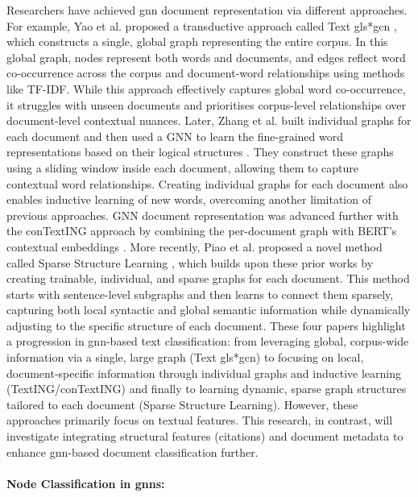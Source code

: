 \documentclass[10pt,oneside]{book}
\begin{document}
Researchers have achieved \gls*{gnn} document representation via different approaches. For example, Yao et al. proposed a transductive approach called Text gls*{gcn} \cite{yao_graph_2018}, which constructs a single, global graph representing the entire corpus. In this global graph, nodes represent both words and documents, and edges reflect word co-occurrence across the corpus and document-word relationships using methods like TF-IDF. While this approach effectively captures global word co-occurrence, it struggles with unseen documents and prioritises corpus-level relationships over document-level contextual nuances. Later, Zhang et al. built individual graphs for each document and then used a GNN to learn the fine-grained word representations based on their logical structures \cite{zhang_evaluating_2020}. They construct these graphs using a sliding window inside each document, allowing them to capture contextual word relationships. Creating individual graphs for each document also enables inductive learning of new words, overcoming another limitation of previous approaches. GNN document representation was advanced further with the conTextING approach by combining the per-document graph with BERT's contextual embeddings \cite{huang_contexting_2022}. More recently, Piao et al. proposed a novel method called Sparse Structure Learning \cite{piao_sparse_2022}, which builds upon these prior works by creating trainable, individual, and sparse graphs for each document. This method starts with sentence-level subgraphs and then learns to connect them sparsely, capturing both local syntactic and global semantic information while dynamically adjusting to the specific structure of each document. These four papers highlight a progression in \gls*{gnn}-based text classification: from leveraging global, corpus-wide information via a single, large graph (Text gls*{gcn}) to focusing on local, document-specific information through individual graphs and inductive learning (TextING/conTextING) and finally to learning dynamic, sparse graph structures tailored to each document (Sparse Structure Learning). However, these approaches primarily focus on textual features. This research, in contrast, will investigate integrating structural features (citations) and document metadata to enhance \gls*{gnn}-based document classification further.

\paragraph{Node Classification in \gls*{gnn}s: }
\end{document}
